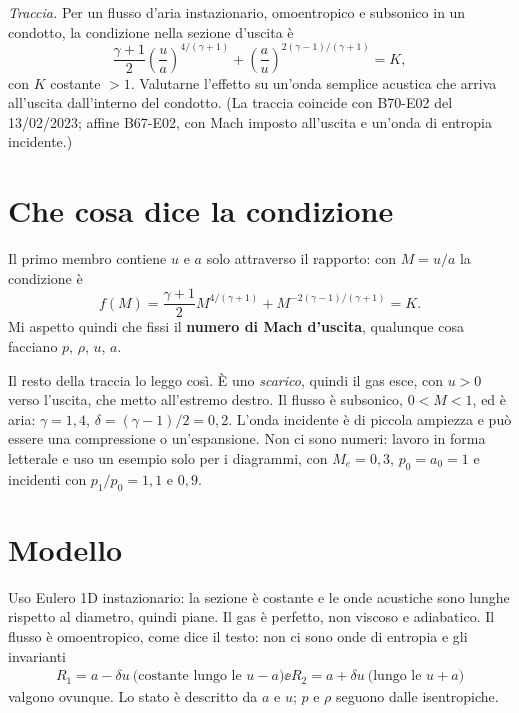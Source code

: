 

\graphicspath{{../../svolgimenti/1970-03-01_E02_condizione_uscita_mach/figure/}}

\newcommand{\uma}{u-a}
\newcommand{\upa}{u+a}
\newcommand{\Me}{M_e}
\newcommand{\Cr}{C_r}



\maketitle

\emph{Traccia.} Per un flusso d'aria instazionario, omoentropico e subsonico in un condotto, la condizione nella
sezione d'uscita è
\[
  \frac{\gamma+1}{2}\left(\frac{u}{a}\right)^{4/(\gamma+1)}+\left(\frac{a}{u}\right)^{2(\gamma-1)/(\gamma+1)}=K,
\]
con $K$ costante $>1$. Valutarne l'effetto su un'onda semplice acustica che arriva all'uscita dall'interno del
condotto. (La traccia coincide con B70-E02 del 13/02/2023; affine B67-E02, con Mach imposto all'uscita e un'onda di
entropia incidente.)

\section*{Che cosa dice la condizione}
Il primo membro contiene $u$ e $a$ solo attraverso il rapporto: con $M=u/a$ la condizione è
\[
  f(M)=\frac{\gamma+1}{2}M^{4/(\gamma+1)}+M^{-2(\gamma-1)/(\gamma+1)}=K .
\]
Mi aspetto quindi che fissi il \textbf{numero di Mach d'uscita}, qualunque cosa facciano $p$, $\rho$, $u$, $a$.

Il resto della traccia lo leggo così. È uno \emph{scarico}, quindi il gas esce, con $u>0$ verso l'uscita, che metto
all'estremo destro. Il flusso è subsonico, $0<M<1$, ed è aria: $\gamma=1{,}4$, $\delta=(\gamma-1)/2=0{,}2$. L'onda
incidente è di piccola ampiezza e può essere una compressione o un'espansione. Non ci sono numeri: lavoro in forma
letterale e uso un esempio solo per i diagrammi, con $\Me=0{,}3$, $p_0=a_0=1$ e incidenti con $p_1/p_0=1{,}1$ e
$0{,}9$.

\section*{Modello}
Uso Eulero 1D instazionario: la sezione è costante e le onde acustiche sono lunghe rispetto al diametro, quindi
piane. Il gas è perfetto, non viscoso e adiabatico. Il flusso è omoentropico, come dice il testo: non ci sono onde
di entropia e gli invarianti
\begin{gather*}
  R_1=a-\delta u\ \text{(costante lungo le $\uma$)} \ee R_2=a+\delta u\ \text{(lungo le $\upa$)}
\end{gather*}
valgono ovunque. Lo stato è descritto da $a$ e $u$; $p$ e $\rho$ seguono dalle isentropiche.

